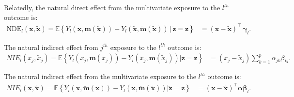 \documentclass[
  12pt]{article}
\def\E{\mathbb{E}}
\begin{document}
Relatedly, the natural direct effect from the multivariate exposure to the $l^{th}$ outcome
is:
\begin{align*}
\text{NDE}_l(\mathbf{x}, \widetilde{\mathbf{x}}) =
\E \left\{ Y_l(\mathbf{x}, \ddot{\mathbf{m}}(\widetilde{\mathbf{x}}))
           - Y_l(\widetilde{\mathbf{x}}, \ddot{\mathbf{m}}(\widetilde{\mathbf{x}}))
           \,\big|\, \ddot{\mathbf{z}} = \mathbf{z} \right\}
&=
(\mathbf{x} - \widetilde{\mathbf{x}})^{\top}\, \bm{\gamma}_l.
\end{align*}

The natural indirect effect from $j^{th}$ exposure to the $l^{th}$ outcome is:
\begin{align*}
NIE_l(x_j, \widetilde{x}_j) =
\E \left \{ Y_l(x_j,\ddot{\mathbf{m}}(x_j)) - Y_l(x_j,\ddot{\mathbf{m}}(\widetilde{x}_j)) \big | \ddot{\mathbf{z}} = \mathbf{z} \right \}
&=(x_j - \widetilde{x}_j) \sum_{k=1}^p \alpha_{jk}\beta_{kl}.
\end{align*}

The natural indirect effect from the multivariate exposure to the $l^{th}$ outcome is:
\begin{align*}
NIE_l(\mathbf{x}, \widetilde{\mathbf{x}}) =
\E \left \{ Y_l(\mathbf{x},\ddot{\mathbf{m}}(\mathbf{x})) - Y_l(\mathbf{x},\ddot{\mathbf{m}}(\widetilde{\mathbf{x}})) \big | \ddot{\mathbf{z}} = \mathbf{z} \right \}
&=
(\mathbf{x} - \widetilde{\mathbf{x} })^{\top} \bm{\alpha} \bm{\beta}_l.
\end{align*}


\end{document}

